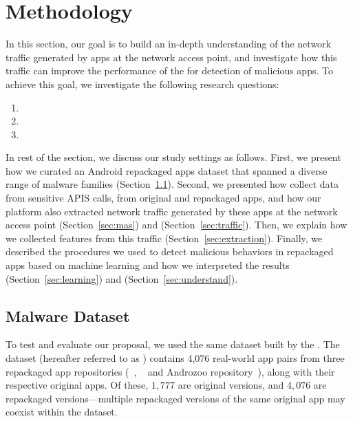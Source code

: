\section{Methodology}\label{sec:Methodology}

In this section, our goal is to build an in-depth understanding of the network traffic generated by apps at the network access point, and investigate how this traffic can improve the performance of the \mas for detection of malicious apps. To achieve this goal, we investigate the following research questions:

\begin{enumerate}[(RQ1)]
\item \rqa
\item \rqb
\item \rqc
\end{enumerate}

In rest of the section, we discuss our study settings as follows. First, we present how we curated an Android repackaged apps dataset that spanned a diverse range of malware families (Section~\ref{sec:dataset}). Second, we presented how \mas collect data from sensitive APIS calls, from original and repackaged apps, and how our platform also extracted network traffic generated by these apps at the network access point (Section~\ref{sec:mas}) and (Section~\ref{sec:traffic}).  Then, we explain how we collected features from this traffic (Section~\ref{sec:extraction}). Finally, we described the procedures we used to detect malicious behaviors in repackaged apps based on machine learning and how we interpreted the results (Section~\ref{sec:learning}) and (Section~\ref{sec:understand}).

\subsection{Malware Dataset}\label{sec:dataset}


To test and evaluate our proposal, we used the same dataset built by the \fhc. The dataset (hereafter referred to as \cds) contains 4,076 real-world app pairs from three repackaged app repositories (\repack~\cite{DBLP:journals/tse/LiBK21}, \amc~\cite{rafiq2022andromalpack} and Androzoo repository~\cite{DBLP:conf/msr/AllixBKT16}), along with their respective original apps. Of these, $1,777$ are original versions, and $4,076$ are repackaged versions—multiple repackaged versions of the same original app may coexist within the \cds dataset.

